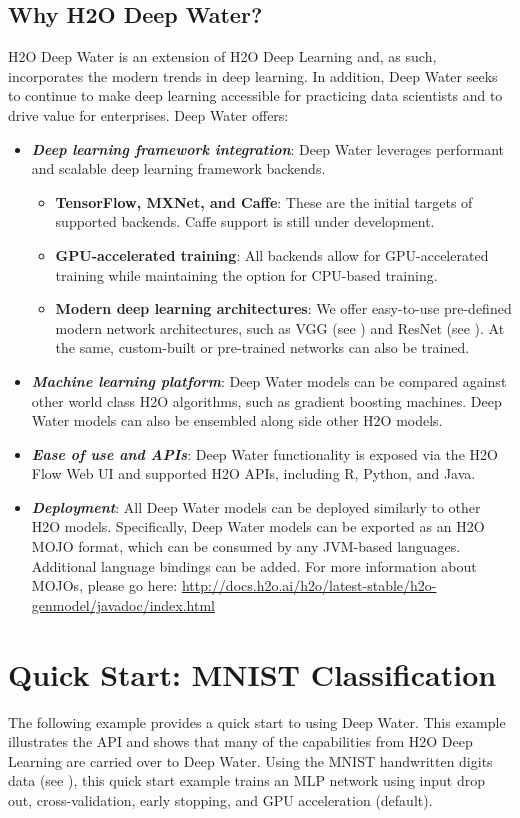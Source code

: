 	\subsection{Why H2O Deep Water?}
		H2O Deep Water is an extension of H2O Deep Learning and, as such, incorporates the modern trends in deep learning.  In addition, Deep Water seeks to continue to make deep learning accessible for practicing data scientists and to drive value for enterprises.  Deep Water offers:
		\begin{itemize}
			\item{\textbf{\textit{Deep learning framework integration}}}: Deep Water leverages performant and scalable deep learning framework backends.
					\begin{itemize}
						\item{\textbf{TensorFlow, MXNet, and Caffe}}: These are the initial targets of supported backends.  Caffe support is still under development.
						\item{\textbf{GPU-accelerated training}}: All backends allow for GPU-accelerated training while maintaining the option for CPU-based training.
						\item{\textbf{Modern deep learning architectures}}: We offer easy-to-use pre-defined modern network architectures, such as VGG (see \textit{} {\cite{vgg}}) and ResNet (see \textit{} {\cite{resnet}}).  At the same, custom-built or pre-trained networks can also be trained.
					\end{itemize}
			\item{\textbf{\textit{Machine learning platform}}}: Deep Water models can be compared against other world class H2O algorithms, such as gradient boosting machines.  Deep Water models can also be ensembled along side other H2O models.
			\item{\textbf{\textit{Ease of use and APIs}}}: Deep Water functionality is exposed via the H2O Flow Web UI and supported H2O APIs, including R, Python, and Java.
			\item{\textbf{\textit{Deployment}}}: All Deep Water models can be deployed similarly to other H2O models.  Specifically, Deep Water models can be exported as an H2O MOJO format, which can be consumed by any JVM-based languages.  Additional language bindings can be added.  For more information about MOJOs, please go here:  {\url{http://docs.h2o.ai/h2o/latest-stable/h2o-genmodel/javadoc/index.html}}
		\end{itemize}

\section{Quick Start: MNIST Classification}
The following example provides a quick start to using Deep Water. This example illustrates the API and shows that many of the capabilities from H2O Deep Learning are carried over to Deep Water.  Using the MNIST handwritten digits data (see \textit{} \cite{mnist}), this quick start example trains an MLP network using input drop out, cross-validation, early stopping, and GPU acceleration (default).

